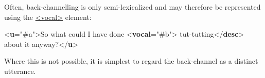 Often, back-channelling is only semi-lexicalized and may therefore be represented using the \hyperref[TEI.vocal]{<vocal>} element: \par\bgroup{}\exampleFont \begin{shaded}\noindent\mbox{}{<\textbf{u}\hspace*{1em}{who}="{\#a}">}So what could I have done {<\textbf{vocal}\hspace*{1em}{who}="{\#b}">}\mbox{}\newline 
\hspace*{1em}tut-tutting{</\textbf{desc}>}\mbox{}\newline 
{} about it anyway?{</\textbf{u}>}\end{shaded}\egroup\par \noindent  Where this is not possible, it is simplest to regard the back-channel as a distinct utterance.
